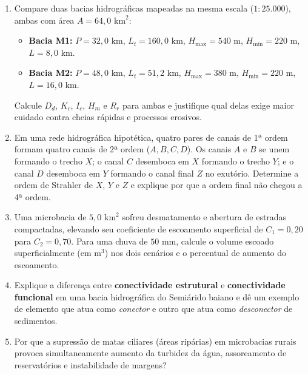 \begin{enumerate}[leftmargin=1.8em, itemsep=4pt, resume]
  \item Compare duas bacias hidrográficas mapeadas na mesma escala ($1{:}25.000$), ambas com área $A = 64{,}0\text{ km}^2$:
  \begin{itemize}[leftmargin=1.4em, itemsep=1pt]
    \item \textbf{Bacia M1:} $P = 32{,}0\text{ km}$, $L_t = 160{,}0\text{ km}$, $H_{\max} = 540\text{ m}$, $H_{\min} = 220\text{ m}$, $L = 8{,}0\text{ km}$.
    \item \textbf{Bacia M2:} $P = 48{,}0\text{ km}$, $L_t = 51{,}2\text{ km}$, $H_{\max} = 380\text{ m}$, $H_{\min} = 220\text{ m}$, $L = 16{,}0\text{ km}$.
  \end{itemize}
  Calcule $D_d$, $K_c$, $I_c$, $H_m$ e $R_r$ para ambas e justifique qual delas exige maior cuidado contra cheias rápidas e processos erosivos.
  \espacoResolucao[2.6cm]

  \item Em uma rede hidrográfica hipotética, quatro pares de canais de 1ª ordem formam quatro canais de 2ª ordem ($A, B, C, D$). Os canais $A$ e $B$ se unem formando o trecho $X$; o canal $C$ desemboca em $X$ formando o trecho $Y$; e o canal $D$ desemboca em $Y$ formando o canal final $Z$ no exutório. Determine a ordem de Strahler de $X$, $Y$ e $Z$ e explique por que a ordem final não chegou a 4ª ordem.
  \espacoResolucao[2.0cm]

  \item Uma microbacia de $5{,}0\text{ km}^2$ sofreu desmatamento e abertura de estradas compactadas, elevando seu coeficiente de escoamento superficial de $C_1 = 0{,}20$ para $C_2 = 0{,}70$. Para uma chuva de $50\text{ mm}$, calcule o volume escoado superficialmente (em $\text{m}^3$) nos dois cenários e o percentual de aumento do escoamento.
  \espacoResolucao[2.2cm]

  \item Explique a diferença entre \textbf{conectividade estrutural} e \textbf{conectividade funcional} em uma bacia hidrográfica do Semiárido baiano e dê um exemplo de elemento que atua como \textit{conector} e outro que atua como \textit{desconector} de sedimentos.
  \espacoResolucao[2.0cm]

  \item Por que a supressão de matas ciliares (áreas ripárias) em microbacias rurais provoca simultaneamente aumento da turbidez da água, assoreamento de reservatórios e instabilidade de margens?
  \espacoResolucao[2.0cm]
\end{enumerate}

